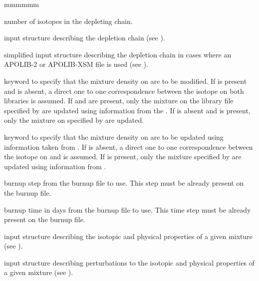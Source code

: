 \begin{ListeDeDescription}{mmmmmm}
\item[\dusa{ndepl}] number of isotopes in the depleting chain.

\item[\dstr{descdepl}] input structure describing the
depletion chain (see ).

\item[\dstr{descdeplA2}] simplified input structure describing the
depletion chain in cases where an APOLIB-2 or APOLIB-XSM file is used (see ).

\item[\moc{MAXS}] keyword to specify that the mixture density on 
are to be modified. If  is present and  is absent, a
direct one to one correspondence between the isotope on both libraries is
assumed. If  and  are present, only the
mixture on the library file specified by  are updated using
information from the . If  is absent and
 is present, only the mixture on   specified by
 are updated.

\item[\moc{BURN}] keyword to specify that the mixture density on 
are to be updated using information taken from . If 
is absent, a direct one to one correspondence between the isotope on
 and   is assumed. If   is present, only
the mixture specified by  are updated using information from
.

\item[\dusa{iburn}] burnup step from the burnup file to use. This step must be
already present on the burnup file.

\item[\dusa{tburn}] burnup time in days from the burnup file to use. This time
step must be already present on the burnup file.

\item[\dstr{descmix1}] input structure describing the
isotopic and physical properties of a given mixture (see ).

\item[\dstr{descmix2}] input structure describing perturbations to the
isotopic and physical properties of a given mixture (see ).


\end{ListeDeDescription}

